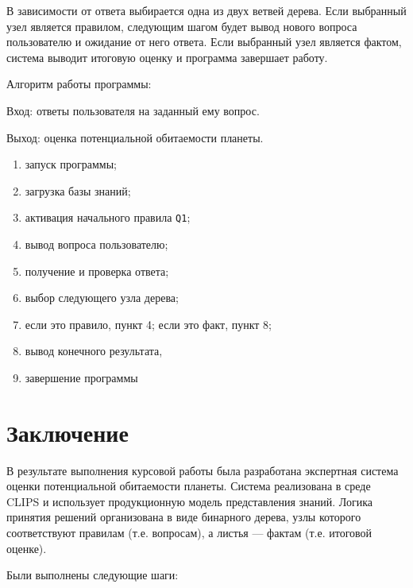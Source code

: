 \documentclass[14pt,a4paper]{extarticle}
\begin{document}
В зависимости от ответа выбирается одна из двух ветвей дерева. Если выбранный узел является правилом, следующим шагом будет вывод нового вопроса пользователю и ожидание от него ответа. Если выбранный узел является фактом, система выводит итоговую оценку и программа завершает работу.

Алгоритм работы программы:

Вход: ответы пользователя на заданный ему вопрос.

Выход: оценка потенциальной обитаемости планеты.

\begin{enumerate}
    \item запуск программы;
    \item загрузка базы знаний;
    \item активация начального правила \texttt{Q1};
    \item вывод вопроса пользователю;
    \item получение и проверка ответа;
    \item выбор следующего узла дерева;
    \item если это правило, пункт 4; если это факт, пункт 8;
    \item вывод конечного результата,
    \item завершение программы
\end{enumerate}

\newpage

\section*{Заключение}

В результате выполнения курсовой работы была разработана экспертная система оценки потенциальной обитаемости планеты. Система реализована в среде CLIPS и использует продукционную модель представления знаний. Логика принятия решений организована в виде бинарного дерева, узлы которого соответствуют правилам (т.е. вопросам), а листья --- фактам (т.е. итоговой оценке).

Были выполнены следующие шаги:
\end{document}

